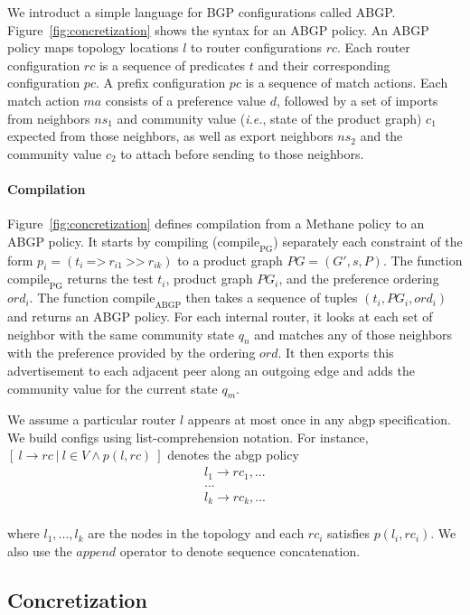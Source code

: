 \documentclass[twocolumn, openany]{sig-alternate-10pt}
\newcommand{\IE}{\emph{i.e.}}
\newcommand{\sysname}{{\small \sf Methane}\xspace}
\newcommand{\para}[1]{\paragraph*{\textbf{#1}}}
\newcommand{\Prefer}{\texttt{>>}}
\newcommand{\Path}{\texttt{=>}}
\begin{document}
We introduct a simple language for BGP configurations called ABGP. Figure~\ref{fig:concretization} shows the syntax for an ABGP policy. An ABGP policy maps topology locations $l$ to router configurations $rc$. Each router configuration $rc$ is a sequence of predicates $t$ and their corresponding configuration $pc$. A prefix configuration $pc$ is a sequence of match actions. Each match action $ma$ consists of a preference value $d$, followed by a set of imports from neighbors $ns_1$ and community value (\IE, state of the product graph) $c_1$ expected from those neighbors, as well as export neighbors $ns_2$ and the community value $c_2$ to attach before sending to those neighbors.%


\para{Compilation}

Figure~\ref{fig:concretization} defines compilation from a \sysname policy to an ABGP policy. It starts by compiling ($\text{compile}_\text{PG}$) separately each constraint of the form $p_i = (t_i ~\Path~ r_{i1} ~\Prefer~ r_{ik})$ to a product graph $PG = (G', s, P)$. The function $\text{compile}_\text{PG}$ returns the test $t_i$, product graph $PG_i$, and the preference ordering $ord_i$.
%
The function $\text{compile}_\text{ABGP}$ then takes a sequence of tuples $(t_i, PG_i, ord_i)$ and returns an ABGP policy. For each internal router, it looks at each set of neighbor with the same community state $q_n$ and matches any of those neighbors with the preference provided by the ordering $ord$. It then exports this advertisement to each adjacent peer along an outgoing edge and adds the community value for the current state $q_m$.%

We assume a particular router $l$ appears at most once in any abgp specification.
We build configs using list-comprehension notation. For instance,
$[~ l \rightarrow rc ~\vert~ l \in V \wedge p(l,rc) ~]$ denotes the abgp policy
%
\[ \begin{array}{c}
  l_1 \rightarrow rc_{1},... \\
  ...           \\
  l_k \rightarrow rc_{k},... \\
\end{array} \]

where $l_1, ..., l_k$ are the nodes in the topology
and each $rc_{i}$ satisfies $p(l_i,rc_{i})$. We also use the $\mathit{append}$ operator to denote sequence concatenation.%


\subsection{Concretization}
\end{document}
